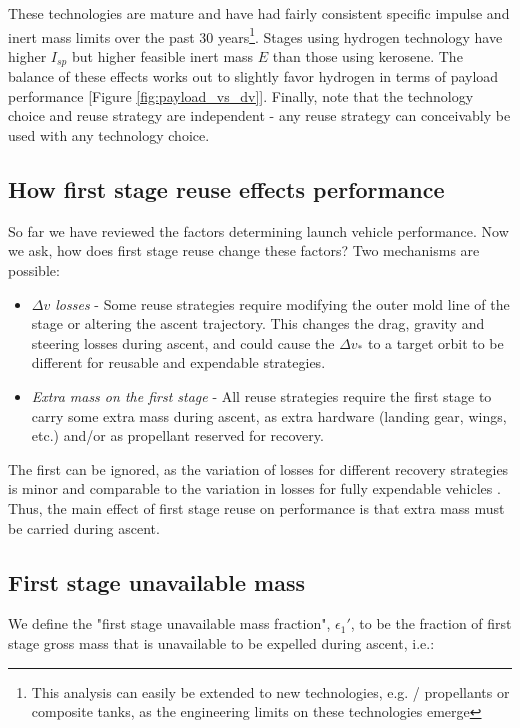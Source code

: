 \documentclass[conf]{new-aiaa}
\begin{document}
These technologies are mature and have had fairly consistent specific impulse and inert mass limits over the past 30 years\footnote{This analysis can easily be extended to new technologies, e.g.  /  propellants or composite tanks, as the engineering limits on these technologies emerge}. Stages using hydrogen technology have higher $I_{sp}$ but higher feasible inert mass $E$ than those using kerosene. The balance of these effects works out to slightly favor hydrogen in terms of payload performance [Figure \ref{fig:payload_vs_dv}]. Finally, note that the technology choice and reuse strategy are independent - any reuse strategy can conceivably be used with any technology choice.


\subsection{How first stage reuse effects performance}
So far we have reviewed the factors determining launch vehicle performance. Now we ask, how does first stage reuse change these factors? Two mechanisms are possible:

\begin{itemize}
    \item \emph{$\Delta v$ losses} - Some reuse strategies require modifying the outer mold line of the stage or altering the ascent trajectory. This changes the drag, gravity and steering losses during ascent, and could cause the $\Delta v_*$ to a target orbit to be different for reusable and expendable strategies.
    \item \emph{Extra mass on the first stage} - All reuse strategies require the first stage to carry some extra mass during ascent, as extra hardware (landing gear, wings, etc.) and/or as propellant reserved for recovery.
\end{itemize}

The first can be ignored, as the variation of losses for different recovery strategies is minor and comparable to the variation in losses for fully expendable vehicles \cite{Stappert2017}. Thus, the main effect of first stage reuse on performance is that extra mass must be carried during ascent.

\subsection{First stage unavailable mass}
We define the "first stage unavailable mass fraction", $\epsilon_1'$, to be the fraction of first stage gross mass that is unavailable to be expelled during ascent, i.e.:
\end{document}
